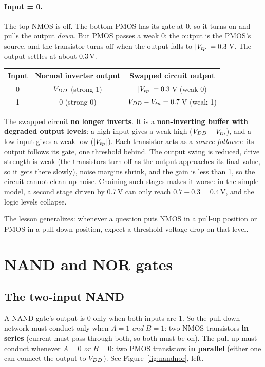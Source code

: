 \paragraph{Input = 0.} The top NMOS is off. The bottom PMOS has its gate at 0, so it turns on and pulls the output \emph{down}. But PMOS passes a weak 0: the output is the PMOS's source, and the transistor turns off when the output falls to $|V_{tp}| = 0.3$\,V. The output settles at about 0.3\,V.

\begin{center}
\begin{tabular}{ccc}
\toprule
Input & Normal inverter output & Swapped circuit output \\
\midrule
0 & $V_{DD}$ (strong 1) & $|V_{tp}| = 0.3$\,V (weak 0) \\
1 & 0 (strong 0) & $V_{DD} - V_{tn} = 0.7$\,V (weak 1) \\
\bottomrule
\end{tabular}
\end{center}

\begin{onoa}
The swapped circuit \textbf{no longer inverts}. It is a \textbf{non-inverting buffer with degraded output levels}: a high input gives a weak high ($V_{DD} - V_{tn}$), and a low input gives a weak low ($|V_{tp}|$). Each transistor acts as a \emph{source follower}: its output follows its gate, one threshold behind. The output swing is reduced, drive strength is weak (the transistors turn off as the output approaches its final value, so it gets there slowly), noise margins shrink, and the gain is less than 1, so the circuit cannot clean up noise. Chaining such stages makes it worse: in the simple model, a second stage driven by 0.7\,V can only reach $0.7 - 0.3 = 0.4$\,V, and the logic levels collapse.
\end{onoa}

The lesson generalizes: whenever a question puts NMOS in a pull-up position or PMOS in a pull-down position, expect a threshold-voltage drop on that level.

\section{NAND and NOR gates}

\subsection*{The two-input NAND}

A NAND gate's output is 0 only when both inputs are 1. So the pull-down network must conduct only when $A = 1$ \emph{and} $B = 1$: two NMOS transistors \textbf{in series} (current must pass through both, so both must be on). The pull-up must conduct whenever $A = 0$ \emph{or} $B = 0$: two PMOS transistors \textbf{in parallel} (either one can connect the output to $V_{DD}$). See Figure~\ref{fig:nandnor}, left.

